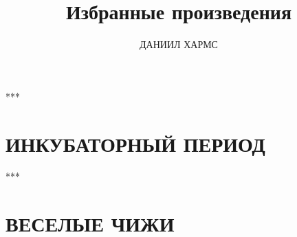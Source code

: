 \documentclass[12pt]{article}
\begin{document}
\title{Избранные произведения}
\author{ДАНИИЛ ХАРМС}
\date{}
\maketitle




***
\section*{ИНКУБАТОРНЫЙ ПЕРИОД}




***
\section*{ВЕСЕЛЫЕ ЧИЖИ}

\end{document}
